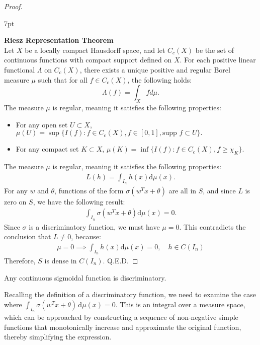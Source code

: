 \documentclass[12pt]{article}
\newenvironment{formal}{%
\def\FrameCommand{%
\hspace{1pt}%
{\color{Blue}\vrule width 2pt}%
{\color{formalshade}\vrule width 4pt}%
\colorbox{formalshade}%
}%
\MakeFramed{\advance\hsize-\width\FrameRestore}%
\noindent\hspace{-4.55pt}%
\begin{adjustwidth}{}{7pt}%
\vspace{2pt}\vspace{2pt}%
}
{%
\vspace{2pt}\end{adjustwidth}\endMakeFramed%
}
\begin{document}
\begin{proof}
\begin{formal}
\textbf{Riesz Representation Theorem}\\
Let $X$ be a locally compact Hausdorff space, and let $C_c(X)$ be the set of continuous functions with compact support defined on $X$. For each positive linear functional $\Lambda$ on $C_c(X)$, there exists a unique positive and regular Borel measure $\mu$ such that for all $f \in C_c(X)$, the following holds:
$$\Lambda(f) = \int_X f d\mu.$$
The measure $\mu$ is regular, meaning it satisfies the following properties:
\begin{itemize}
    \item For any open set \( U \subset X \),
    $
    \mu(U) = \sup \{ I(f) : f \in C_c(X), f \in [0,1], \text{supp } f \subset U \}.
    $
    \item For any compact set \( K \subset X \),
    $
    \mu(K) = \inf \{ I(f) : f \in C_c(X), f \geq \chi_K \}.
    $
\end{itemize}
\end{formal}
The measure $\mu$ is regular, meaning it satisfies the following properties:
\begin{align*}
    L(h)=\int_{I_n} h(x)\mathrm{d}\mu(x).
\end{align*}
For any $w$ and $\theta$, functions of the form $\sigma(w^T x + \theta)$ are all in $S$, and since $L$ is zero on $S$, we have the following result:
\begin{align*}
    \int_{I_n} \sigma(w^Tx+\theta)\mathrm{d}\mu(x)=0.
\end{align*}
Since $\sigma$ is a discriminatory function, we must have $\mu = 0$. This contradicts the conclusion that $L \neq 0$, because:
\begin{align*}
    \mu=0 \implies \int_{I_n} h(x)\mathrm{d}\mu(x)=0,\quad h\in C(I_n)
\end{align*}
Therefore, $S$ is dense in $C(I_n)$. Q.E.D.

\end{proof}

\begin{mylemma}
    Any continuous sigmoidal function is discriminatory.
\end{mylemma}
Recalling the definition of a discriminatory function, we need to examine the case where $\int_{I_n} \sigma(w^T x + \theta) \, \mathrm{d}\mu(x) = 0$. This is an integral over a measure space, which can be approached by constructing a sequence of non-negative simple functions that monotonically increase and approximate the original function, thereby simplifying the expression.
\end{document}
